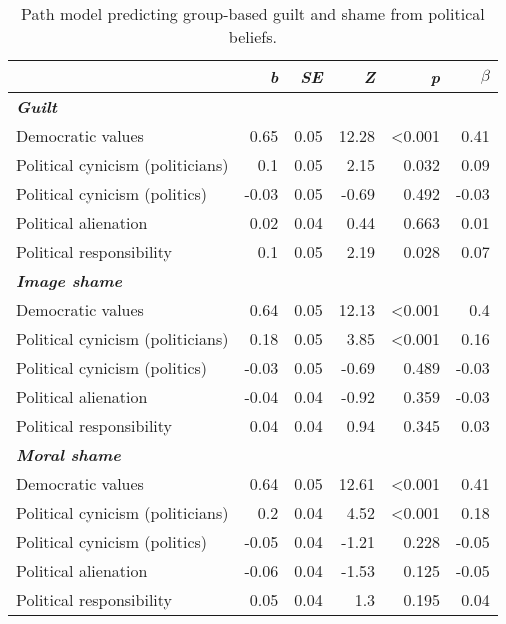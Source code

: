 \documentclass[
]{article}
\begin{document}
\begin{table}[H]

\caption{\label{tab:TableS1}Path model predicting group-based guilt and shame from political beliefs.}
\centering
\fontsize{8}{10}\selectfont
\begin{tabular}[t]{lrrrrr}
\toprule
\em{ } & \em{b} & \em{SE} & \em{Z} & \em{p} & \em{$\beta$}\\
\midrule
\em{\textbf{Guilt}} & \em{\textbf{}} & \em{\textbf{}} & \em{\textbf{}} & \em{\textbf{}} & \em{\textbf{}}\\
Democratic values & 0.65 & 0.05 & 12.28 & <0.001 & 0.41\\
Political cynicism (politicians) & 0.1 & 0.05 & 2.15 & 0.032 & 0.09\\
Political cynicism (politics) & -0.03 & 0.05 & -0.69 & 0.492 & -0.03\\
Political alienation & 0.02 & 0.04 & 0.44 & 0.663 & 0.01\\
\addlinespace
Political responsibility & 0.1 & 0.05 & 2.19 & 0.028 & 0.07\\
\em{\textbf{Image shame}} & \em{\textbf{}} & \em{\textbf{}} & \em{\textbf{}} & \em{\textbf{}} & \em{\textbf{}}\\
Democratic values & 0.64 & 0.05 & 12.13 & <0.001 & 0.4\\
Political cynicism (politicians) & 0.18 & 0.05 & 3.85 & <0.001 & 0.16\\
Political cynicism (politics) & -0.03 & 0.05 & -0.69 & 0.489 & -0.03\\
\addlinespace
Political alienation & -0.04 & 0.04 & -0.92 & 0.359 & -0.03\\
Political responsibility & 0.04 & 0.04 & 0.94 & 0.345 & 0.03\\
\em{\textbf{Moral shame}} & \em{\textbf{}} & \em{\textbf{}} & \em{\textbf{}} & \em{\textbf{}} & \em{\textbf{}}\\
Democratic values & 0.64 & 0.05 & 12.61 & <0.001 & 0.41\\
Political cynicism (politicians) & 0.2 & 0.04 & 4.52 & <0.001 & 0.18\\
\addlinespace
Political cynicism (politics) & -0.05 & 0.04 & -1.21 & 0.228 & -0.05\\
Political alienation & -0.06 & 0.04 & -1.53 & 0.125 & -0.05\\
Political responsibility & 0.05 & 0.04 & 1.3 & 0.195 & 0.04\\
\bottomrule
\end{tabular}
\end{table}
\end{document}
